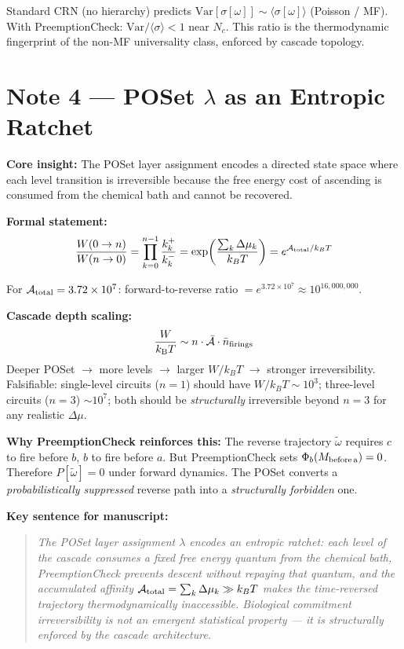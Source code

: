 \documentclass[11pt,a4paper]{article}
\newcommand{\kB}{k_{\mathrm{B}}}
\begin{document}
Standard CRN (no hierarchy) predicts $\mathrm{Var}[\sigma[\omega]] \sim
\langle\sigma[\omega]\rangle$ (Poisson / MF). With PreemptionCheck:
$\mathrm{Var}/\langle\sigma\rangle < 1$ near $N_c$. This ratio is the
thermodynamic fingerprint of the non-MF universality class, enforced by
cascade topology.

\section*{Note 4 — POSet $\lambda$ as an Entropic Ratchet}

\textbf{Core insight:} The POSet layer assignment encodes a directed
state space where each level transition is irreversible because the free
energy cost of ascending is consumed from the chemical bath and cannot
be recovered.

\textbf{Formal statement:}
$$\frac{W(0 \to n)}{W(n \to 0)} = \prod_{k=0}^{n-1} \frac{k^+_k}{k^-_k}
= \exp\!\left(\frac{\sum_k \Delta\mu_k}{k_BT}\right)
= e^{\mathcal{A}_{\rm total}/k_BT}$$

For $\mathcal{A}_{\rm total} = 3.72\times10^7$: forward-to-reverse ratio
$= e^{3.72\times10^7} \approx 10^{16{,}000{,}000}$.

\textbf{Cascade depth scaling:}
$$\frac{W}{\kB T} \sim n \cdot \bar{\mathcal{A}} \cdot \bar{n}_{\rm firings}$$
Deeper POSet $\to$ more levels $\to$ larger $W/k_BT$ $\to$ stronger
irreversibility. Falsifiable: single-level circuits ($n=1$) should have
$W/k_BT \sim 10^3$; three-level circuits ($n=3$) $\sim 10^7$;
both should be \emph{structurally} irreversible beyond $n = 3$ for any
realistic $\Delta\mu$.

\textbf{Why PreemptionCheck reinforces this:}
The reverse trajectory $\tilde\omega$ requires $c$ to fire before $b$,
$b$ to fire before $a$. But PreemptionCheck sets $\Phi_b(M_{\rm before\,a})
= 0$. Therefore $P[\tilde\omega] = 0$ under forward dynamics. The POSet
converts a \emph{probabilistically suppressed} reverse path into a
\emph{structurally forbidden} one.

\textbf{Key sentence for manuscript:}
\begin{quote}
\emph{The POSet layer assignment $\lambda$ encodes an entropic ratchet:
each level of the cascade consumes a fixed free energy quantum from the
chemical bath, PreemptionCheck prevents descent without repaying that
quantum, and the accumulated affinity $\mathcal{A}_{\rm total} =
\sum_k \Delta\mu_k \gg k_BT$ makes the time-reversed trajectory
thermodynamically inaccessible. Biological commitment irreversibility is
not an emergent statistical property --- it is structurally enforced by
the cascade architecture.}
\end{quote}
\end{document}
